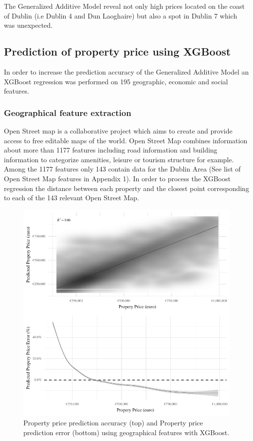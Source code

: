 \documentclass[]{elsarticle} %
\begin{document}
The Generalized Additive Model reveal not only high prices located on
the coast of Dublin (i.e Dublin 4 and Dun Laoghaire) but also a spot in
Dublin 7 which was unexpected.

\hypertarget{prediction-of-property-price-using-xgboost}{%
\subsection{Prediction of property price using
XGBoost}\label{prediction-of-property-price-using-xgboost}}

In order to increase the prediction accuracy of the Generalized Additive
Model an XGBoost regression was performed on 195 geographic, economic
and social features.

\hypertarget{geographical-feature-extraction}{%
\subsubsection{Geographical feature
extraction}\label{geographical-feature-extraction}}

Open Street map is a collaborative project which aims to create and
provide access to free editable maps of the world. Open Street Map
combines information about more than 1177 features including road
information and building information to categorize amenities, leisure or
tourism structure for example. Among the 1177 features only 143 contain
data for the Dublin Area (See list of Open Street Map features in
Appendix 1). In order to process the XGBoost regression the distance
between each property and the closest point corresponding to each of the
143 relevant Open Street Map.

\begin{figure}[H]
\includegraphics{property_price_paper_new_files/figure-latex/OSM-features-xgb-1} \caption{Property price prediction accuracy (top) and Property price prediction error (bottom) using geographical features with XGBoost.}\label{fig:OSM-features-xgb}
\end{figure}
\end{document}
